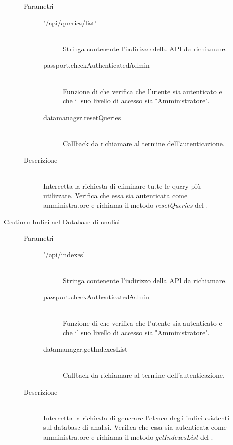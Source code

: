 \begin{description}
\begin{description}
\begin{mldescription}
     \hfill 
    \begin{description}
    \item[Parametri] \hfill
     \begin{description}
      \item['/api/queries/list'] \hfill \\
      Stringa contenente l'indirizzo della API da richiamare.
      \item[passport.checkAuthenticatedAdmin] \hfill \\
      Funzione di  che verifica che l'utente sia autenticato e che il suo livello di accesso sia "Amministratore".
      \item[datamanager.resetQueries] \hfill \\
      Callback da richiamare al termine dell'autenticazione.
     \end{description}
    \item[Descrizione] \hfill \\
    Intercetta la richiesta di eliminare tutte le query più utilizzate. Verifica che essa sia autenticata come amministratore e richiama il metodo \textit{resetQueries} del .
    \end{description}
 
 \end{mldescription}  
 
 \item[Gestione Indici nel Database di analisi]
  \begin{mldescription}
     \hfill 
    \begin{description}
    \item[Parametri] \hfill
     \begin{description}
      \item['/api/indexes'] \hfill \\
      Stringa contenente l'indirizzo della API da richiamare.
      \item[passport.checkAuthenticatedAdmin] \hfill \\
      Funzione di  che verifica che l'utente sia autenticato e che il suo livello di accesso sia "Amministratore".
      \item[datamanager.getIndexesList] \hfill \\
      Callback da richiamare al termine dell'autenticazione.
     \end{description}
    \item[Descrizione] \hfill \\
    Intercetta la richiesta di generare l'elenco degli indici esistenti sul database di analisi. Verifica che essa sia autenticata come amministratore e richiama il metodo \textit{getIndexesList} del .
    \end{description}
    

\end{mldescription}
\end{description}
\end{description}
